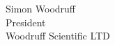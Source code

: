 \documentclass[english]{article}
\begin{document}



Simon Woodruff \\

President \\

Woodruff Scientific LTD
\newpage
\tableofcontents
\newpage 
%

\newpage 
\end{document}
